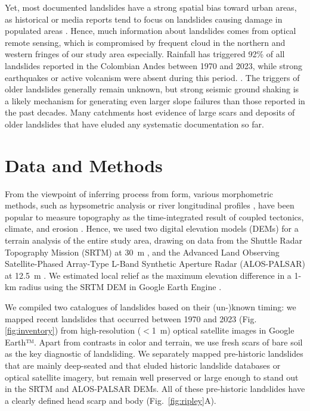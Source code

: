 \documentclass[draft]{agujournal2019}
\begin{document}
\par Yet, most documented landslides have a strong spatial bias toward urban areas, as historical or media reports tend to focus on landslides causing damage in populated areas \cite{guzzetti2012landslide, froude2018global}. Hence, much information about landslides comes from optical remote sensing, which is compromised by frequent cloud in the northern and western fringes of our study area especially. Rainfall has triggered 92\% of all landslides reported in the Colombian Andes between 1970 and 2023, while strong earthquakes or active volcanism were absent during this period. \cite{aristizabal2020}. The triggers of older landslides generally remain unknown, but strong seismic ground shaking is a likely mechanism for generating even larger slope failures than those reported in the past decades. Many catchments host evidence of large scars and deposits of older landslides that have eluded any systematic documentation so far.


\section{Data and Methods}
\par From the viewpoint of inferring process from form, various morphometric methods, such as hypsometric analysis \cite{Strahler1952} or river longitudinal profiles \cite{Wobus2006}, have been popular to measure topography as the time-integrated result of coupled tectonics, climate, and erosion \cite{Whittaker2012, Perron2013, Willett2014}. Hence, we used two digital elevation models (DEMs) for a terrain analysis of the entire study area, drawing on data from the Shuttle Radar Topography Mission (SRTM) at 30~m \cite{farr2007}, and the Advanced Land Observing Satellite-Phased Array-Type L-Band Synthetic Aperture Radar (ALOS-PALSAR) at 12.5~m \cite{logan2014}. We estimated local relief as the maximum elevation difference in a 1-km radius using the SRTM DEM in Google Earth Engine \cite{moore2011}. 

\par We compiled two catalogues of landslides based on their (un-)known timing: we mapped recent landslides that occurred between 1970 and 2023 (Fig. \ref{fig:inventory}) from high-resolution ($<$1~m) optical satellite images in Google Earth™. Apart from contrasts in color and terrain, we use fresh scars of bare soil as the key diagnostic of landsliding. We separately mapped pre-historic landslides that are mainly deep-seated and that eluded historic landslide databases or optical satellite imagery, but remain well preserved or large enough to stand out in the SRTM and ALOS-PALSAR DEMs. All of these pre-historic landslides have a clearly defined head scarp and body (Fig.~\ref{fig:ripley}A).
\end{document}
